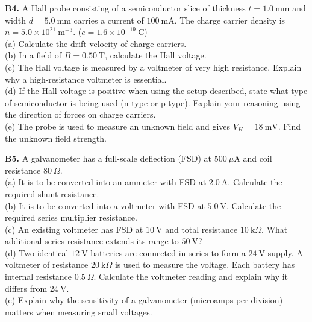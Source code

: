 \begin{exercisebox}[25]
\vspace{0.4cm}

\textbf{B4.} A Hall probe consisting of a
semiconductor slice of thickness $t = 1.0\ \text{mm}$
and width $d = 5.0\ \text{mm}$ carries a current of
$100\ \text{mA}$. The charge carrier density is
$n = 5.0\times10^{21}\ \text{m}^{-3}$.
($e = 1.6\times10^{-19}\ \text{C}$)\\[4pt]
(a) Calculate the drift velocity of charge carriers.\\
(b) In a field of $B = 0.50\ \text{T}$, calculate
the Hall voltage.\\
(c) The Hall voltage is measured by a voltmeter of
very high resistance. Explain why a high-resistance
voltmeter is essential.\\
(d) If the Hall voltage is positive when using the
setup described, state what type of semiconductor
is being used (n-type or p-type). Explain your
reasoning using the direction of forces on charge
carriers.\\
(e) The probe is used to measure an unknown field and
gives $V_H = 18\ \text{mV}$. Find the unknown field
strength.
\hfill{}

\vspace{0.4cm}

\textbf{B5.} A galvanometer has a full-scale
deflection (FSD) at $500\ \mu\text{A}$ and coil
resistance $80\ \Omega$.\\[4pt]
(a) It is to be converted into an ammeter with FSD
at $2.0\ \text{A}$. Calculate the required shunt
resistance.\\
(b) It is to be converted into a voltmeter with FSD
at $5.0\ \text{V}$. Calculate the required series
multiplier resistance.\\
(c) An existing voltmeter has FSD at $10\ \text{V}$
and total resistance $10\ \text{k}\Omega$. What
additional series resistance extends its range to
$50\ \text{V}$?\\
(d) Two identical $12\ \text{V}$ batteries are
connected in series to form a $24\ \text{V}$ supply.
A voltmeter of resistance $20\ \text{k}\Omega$ is
used to measure the voltage. Each battery has
internal resistance $0.5\ \Omega$. Calculate the
voltmeter reading and explain why it differs from
$24\ \text{V}$.\\
(e) Explain why the sensitivity of a galvanometer
(microamps per division) matters when measuring
small voltages.
\hfill{}

\end{exercisebox}
